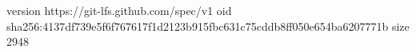 version https://git-lfs.github.com/spec/v1
oid sha256:4137df739e5f6f767617f1d2123b915fbc631c75cddb8ff050e654ba6207771b
size 2948
